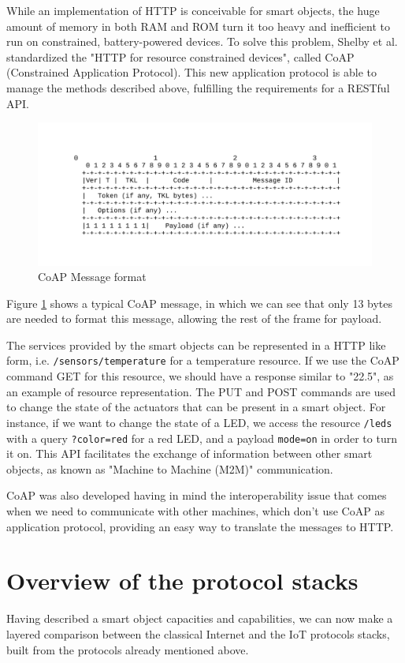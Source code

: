 While an implementation of HTTP is conceivable for smart objects, the huge amount of memory in both RAM and ROM turn it too heavy and inefficient to run on constrained, battery-powered devices\cite{Shelby10EWS}.
To solve this problem, Shelby et al. standardized the "HTTP for resource constrained devices"\cite{rfc7252}, called CoAP (Constrained Application Protocol).
This new application protocol is able to manage the methods described above, fulfilling the requirements for a RESTful API.
\begin{figure}[htb]
	\centering
	\includegraphics[width=1\columnwidth]{chapters/background.images/CoAPMessageFormat.pdf}
	\caption{CoAP Message format}
	\label{fig:CoAPMessageFormat}
\end{figure}
Figure \ref{fig:CoAPMessageFormat} shows a typical CoAP message, in which we can see that only 13 bytes are needed to format this message, allowing the rest of the frame for payload.

The services provided by the smart objects can be represented in a HTTP like form, i.e. \texttt{/sensors/temperature} for a temperature resource. If we use the CoAP command GET for this resource, we should have a response similar to "22.5", as an example of resource representation.
The PUT and POST commands are used to change the state of the actuators that can be present in a smart object.
For instance, if we want to change the state of a LED, we access the resource \texttt{/leds} with a query \texttt{?color=red} for a red LED, and a payload \texttt{mode=on} in order to turn it on.
This API facilitates the exchange of information between other smart objects, as known as "Machine to Machine (M2M)" communication.

CoAP was also developed having in mind the interoperability issue that comes when we need to communicate with other machines, which don't use CoAP as application protocol, providing an easy way to translate the messages to HTTP.

\section{Overview of the protocol stacks}
Having described a smart object capacities and capabilities, we can now make a layered comparison between the classical Internet and the IoT protocols stacks, built from the protocols already mentioned above.

